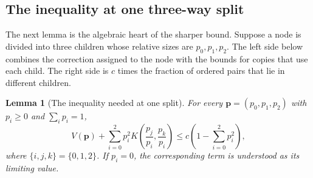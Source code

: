 \documentclass[11pt]{article}
\numberwithin{equation}{section}
\newtheorem{lemma}[lemma]{Lemma}
\theoremstyle{remark}
\begin{document}
\subsection{The inequality at one three-way split}
The next lemma is the algebraic heart of the sharper bound.  Suppose a node
is divided into three children whose relative sizes are $p_0,p_1,p_2$.
The left side below combines the correction assigned to the node with the
bounds for copies that use each child.  The right side is $c$ times the
fraction of ordered pairs that lie in different children.

\begin{lemma}[The inequality needed at one split]
\label{lem:one-three-way-split}
For every $\mathbf p=(p_0,p_1,p_2)$ with $p_i\ge0$ and $\sum_i p_i=1$,
\begin{equation}\label{eq:one-three-way-split}
 V(\mathbf p)+\sum_{i=0}^2p_i^2
 K\left(\frac{p_j}{p_i},\frac{p_k}{p_i}\right)
 \le c\left(1-\sum_{i=0}^2p_i^2\right),
\end{equation}
where $\{i,j,k\}=\{0,1,2\}$.  If $p_i=0$, the corresponding term is
understood as its limiting value.
\end{lemma}
\end{document}

